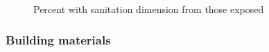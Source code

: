 \documentclass[
  letterpaper,
  DIV=11,
  numbers=noendperiod]{scrartcl}
\begin{document}
\begin{figure}[H]


\caption{\label{fig-sanitation}Percent with sanitation dimension from
those exposed}

\end{figure}%

\subsubsection{Building materials}\label{building-materials-1}
\end{document}
